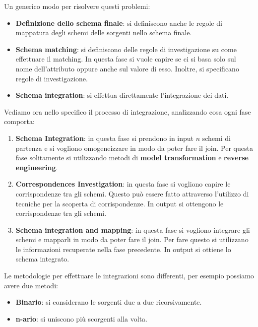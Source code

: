 Un generico modo per risolvere questi problemi:
\begin{itemize}
      \item \textbf{Definizione dello schema finale}: si definiscono anche le regole di
            mappatura degli schemi delle sorgenti nello schema finale.
      \item \textbf{Schema matching}: si definiscono delle regole di investigazione su come
            effettuare il matching. In questa fase si vuole capire se ci si basa
            solo sul nome dell'attributo oppure anche sul valore di esso. Inoltre,
            si specificano regole di investigazione.
      \item \textbf{Schema integration}: si effettua direttamente l'integrazione dei dati.
\end{itemize}
Vediamo ora nello specifico il processo di integrazione, analizzando cosa ogni
fase comporta:
\begin{enumerate}
      \item \textbf{Schema Integration}: in questa fase si prendono in input $n$
            schemi di partenza e si vogliono omogeneizzare in modo da poter fare
            il join. Per questa fase solitamente si utilizzando metodi di \textbf{
                  model transformation} e \textbf{reverse engineering}.
      \item \textbf{Correspondences Investigation}: in questa fase si vogliono
            capire le corrispondenze tra gli schemi. Questo può essere fatto
            attraverso l'utilizzo di tecniche per la scoperta di corrispondenze.
            In output si ottengono le corrispondenze tra gli schemi.
      \item \textbf{Schema integration and mapping}: in questa fase si vogliono
            integrare gli schemi e mapparli in modo da poter fare il join. Per
            fare questo si utilizzano le informazioni recuperate nella fase
            precedente. In output si ottiene lo schema integrato.
\end{enumerate}

Le metodologie per effettuare le integrazioni sono differenti, per esempio possiamo
avere due metodi:
\begin{itemize}
      \item \textbf{Binario}: si considerano le sorgenti due a due ricorsivamente.
      \item \textbf{n-ario}: si uniscono più scorgenti alla volta.
\end{itemize}

